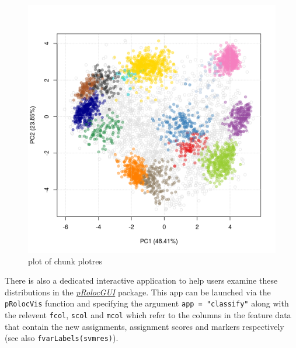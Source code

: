 \begin{figure}[htbp]
\centering
\includegraphics{figure/plotres-1.png}
\caption{plot of chunk plotres}
\end{figure}

There is also a dedicated interactive application to help users examine
these distributions in the
\emph{\href{http://bioconductor.org/packages/pRolocGUI}{pRolocGUI}}
package. This app can be launched via the \texttt{pRolocVis} function
and specifying the argument \texttt{app = "classify"} along with the
relevent \texttt{fcol}, \texttt{scol} and \texttt{mcol} which refer to
the columns in the feature data that contain the new assignments,
assignment scores and markers respectively (see also
\texttt{fvarLabels(svmres)}).

\begin{Shaded}
\begin{Highlighting}[]
\NormalTok{(}\NormalTok{)}
           \NormalTok{,}
           \NormalTok{,}
             \NormalTok{,}
           \NormalTok{)}
\end{Highlighting}
\end{Shaded}


